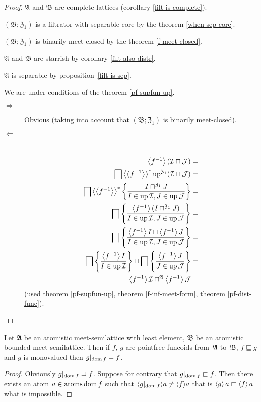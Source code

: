 \begin{proof}
$\mathfrak{A}$ and $\mathfrak{B}$ are complete lattices (corollary
\ref{filt-is-complete}).

$(\mathfrak{B};\mathfrak{Z}_{1})$ is a filtrator with separable core
by the theorem \ref{when-sep-core}.

$(\mathfrak{B};\mathfrak{Z}_{1})$ is binarily meet-closed by the
theorem \ref{f-meet-closed}.

$\mathfrak{A}$ and $\mathfrak{B}$ are starrish by corollary \ref{filt-also-distr}.

$\mathfrak{A}$ is separable by proposition~\ref{filt-is-sep}.

We are under conditions of the theorem \ref{pf-supfun-up}.
\begin{description}
\item [{$\Rightarrow$}] Obvious (taking into account that $(\mathfrak{B};\mathfrak{Z}_{1})$
is binarily meet-closed).
\item [{$\Leftarrow$}] ~
\begin{align*}
\left\langle f^{-1}\right\rangle(\mathcal{I}\sqcap\mathcal{J}) & =\\
\bigsqcap\left\langle \left\langle f^{-1}\right\rangle\right\rangle ^{\ast}\operatorname{up}^{\mathfrak{Z}_{1}}(\mathcal{I}\sqcap\mathcal{J}) & =\\
\bigsqcap\left\langle \left\langle f^{-1}\right\rangle\right\rangle ^{\ast}\left\{ \frac{I\sqcap^{\mathfrak{Z}_{1}}J}{I\in\operatorname{up}\mathcal{I},J\in\operatorname{up}\mathcal{J}}\right\} & =\\
\bigsqcap\left\{ \frac{\left\langle f^{-1}\right\rangle(I\sqcap^{\mathfrak{Z}_{1}}J)}{I\in\operatorname{up}\mathcal{I},J\in\operatorname{up}\mathcal{J}}\right\} & =\\
\bigsqcap\left\{ \frac{\left\langle f^{-1}\right\rangle I\sqcap\left\langle f^{-1}\right\rangle J}{I\in\operatorname{up}\mathcal{I},J\in\operatorname{up}\mathcal{J}}\right\} & =\\
\bigsqcap\left\{ \frac{\left\langle f^{-1}\right\rangle I}{I\in\operatorname{up}\mathcal{I}}\right\}\sqcap\bigsqcap\left\{ \frac{\left\langle f^{-1}\right\rangle J}{J\in\operatorname{up}\mathcal{J}}\right\} & =\\
\left\langle f^{-1}\right\rangle\mathcal{I}\sqcap^{\mathfrak{A}}\left\langle f^{-1}\right\rangle\mathcal{J}
\end{align*}
(used theorem \ref{pf-supfun-up}, theorem \ref{f-inf-meet-form},
theorem \ref{pf-dist-func}).
\end{description}
\end{proof}
\begin{prop}
Let $\mathfrak{A}$ be an atomistic meet-semilattice with least element,
$\mathfrak{B}$ be an atomistic bounded meet-semilattice. Then if
$f$, $g$ are pointfree funcoids from~$\mathfrak{A}$ to~$\mathfrak{B}$,
$f\sqsubseteq g$ and $g$ is monovalued then $g|_{\operatorname{dom} f}=f$.\end{prop}
\begin{proof}
Obviously $g|_{\operatorname{dom} f}\sqsupseteq f$. Suppose for contrary that $g|_{\operatorname{dom} f}\sqsubset f$.
Then there exists an atom $a\in\operatorname{atoms}\operatorname{dom} f$ such that $\langle g|_{\operatorname{dom} f}\rangle a\neq\langle f\rangle a$
that is $\left\langle g\right\rangle a\sqsubset\left\langle f\right\rangle a$ what is impossible.
\end{proof}

